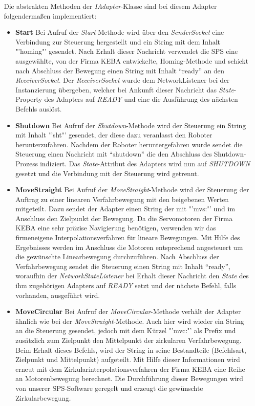 Die abstrakten Methoden der \textit{IAdapter}-Klasse sind bei diesem Adapter folgendermaßen implementiert:
\begin{itemize}
\item \textbf{Start}
\newline
Bei Aufruf der \textit{Start}-Methode wird über den \textit{SenderSocket} eine Verbindung zur Steuerung hergestellt und ein String mit dem Inhalt "'homing"' gesendet. Nach Erhalt dieser Nachricht verwendet die SPS eine ausgewählte, von der Firma KEBA entwickelte, Homing-Methode und schickt nach Abschluss der Bewegung einen String mit Inhalt “ready” an den \textit{ReceiverSocket}. Der \textit{ReceiverSocket} wurde dem NetworkListener bei der Instanzierung übergeben, welcher bei Ankunft dieser Nachricht das \textit{State}-Property des Adapters auf \textit{READY} und eine die Ausführung des nächsten Befehls auslöst.
\item \textbf{Shutdown}
\newline
Bei Aufruf der \textit{Shutdown}-Methode wird der Steuerung ein String mit Inhalt "'sht"' gesendet, der diese dazu veranlasst den Roboter herunterzufahren. Nachdem der Roboter heruntergefahren wurde sendet die Steuerung einen Nachricht mit “shutdown” die den Abschluss des Shutdown-Prozess indiziert. Das \textit{State}-Attribut des Adapters wird nun auf \textit{SHUTDOWN} gesetzt und die Verbindung mit der Steuerung wird getrennt.
\item \textbf{MoveStraight}
\newline
Bei Aufruf der \textit{MoveStraight}-Methode wird der Steuerung der Auftrag zu einer linearen Verfahrbewegung mit den beigebenen Werten mitgeteilt. Dazu sendet der Adapter einen String der mit "'mvs:"' und im Anschluss den Zielpunkt der Bewegung. Da die Servomotoren der Firma KEBA eine sehr präzise Navigierung benötigen, verwenden wir das firmeneigene Interpolationsverfahren für lineare Bewegungen. Mit Hilfe des Ergebnisses werden im Anschluss die Motoren entsprechend angesteuert um die gewünschte Linearbewegung durchzuführen. Nach Abschluss der Verfahrbewegung sendet die Steuerung einen String mit Inhalt “ready”, woraufhin der \textit{NetworkStateListener} bei Erhalt dieser Nachricht den \textit{State} des ihm zugehörigen Adapters auf \textit{READY} setzt und der nächste Befehl, falls vorhanden, ausgeführt wird.
\item \textbf{MoveCircular}
\newline
Bei Aufruf der \textit{MoveCircular}-Methode verhält der Adapter ähnlich wie bei der \textit{MoveStraight}-Methode. Auch hier wird wieder ein String an die Steuerung gesendet, jedoch mit dem Kürzel "'mvc:"' als Prefix und zusätzlich zum Zielpunkt den Mittelpunkt der zirkularen Verfahrbewegung. Beim Erhalt dieses Befehls, wird der String in seine Bestandteile (Befehlsart, Zielpunkt und Mittelpunkt) aufgeteilt. Mit Hilfe dieser Informationen wird erneut mit dem Zirkularinterpolationsverfahren der Firma KEBA eine Reihe an Motorenbewegung berechnet. Die Durchführung dieser Bewegungen wird von unserer SPS-Software geregelt und erzeugt die gewünschte Zirkularbewegung. 

\end{itemize}
